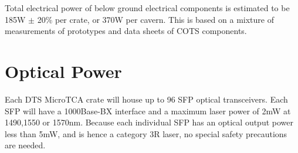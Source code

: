 \documentclass[fleqn,12pt,a4paper]{olplainarticle}
\begin{document}
Total electrical power of below ground electrical components is estimated to be 185W $\pm$ 20\% per crate, or 370W per cavern. This is based on a mixture of measurements of prototypes and data sheets of COTS components.

\section{Optical Power}

Each DTS MicroTCA crate will house up to 96 SFP optical transceivers. Each SFP will have a 1000Base-BX interface and a maximum laser power of 2mW at 1490,1550 or 1570nm. Because each individual SFP has an optical output power less than 5mW, and is hence a category 3R laser, no special safety precautions are needed.




%
\end{document}
